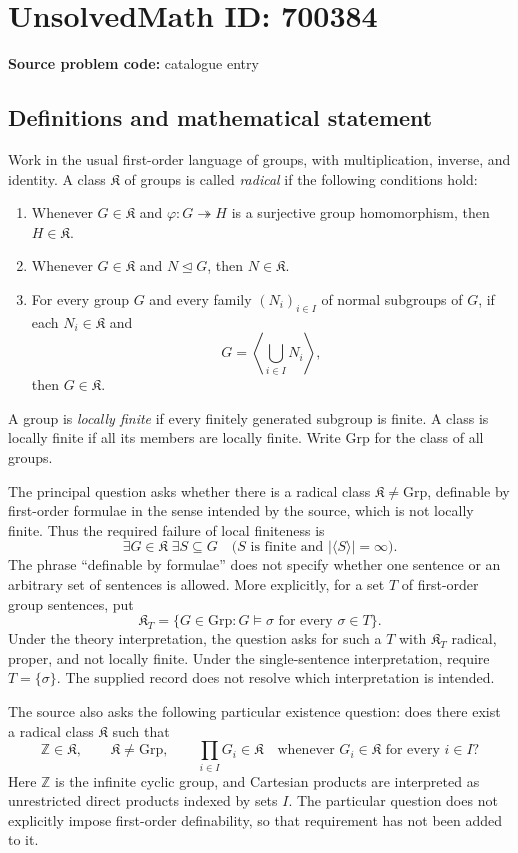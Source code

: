 \documentclass[11pt]{article}
\begin{document}
\section*{UnsolvedMath ID: 700384}
\textbf{Source problem code:} catalogue entry
\subsection{Definitions and mathematical statement}
Work in the usual first-order language of groups, with multiplication, inverse, and identity. A class \(\mathfrak K\) of groups is called \emph{radical} if the following conditions hold:
\begin{enumerate}
\item Whenever \(G\in\mathfrak K\) and \(\varphi:G\twoheadrightarrow H\) is a surjective group homomorphism, then \(H\in\mathfrak K\).
\item Whenever \(G\in\mathfrak K\) and \(N\trianglelefteq G\), then \(N\in\mathfrak K\).
\item For every group \(G\) and every family \((N_i)_{i\in I}\) of normal subgroups of \(G\), if each \(N_i\in\mathfrak K\) and
\[
G=\left\langle\bigcup_{i\in I}N_i\right\rangle,
\]
then \(G\in\mathfrak K\).
\end{enumerate}
A group is \emph{locally finite} if every finitely generated subgroup is finite. A class is locally finite if all its members are locally finite. Write \(\mathrm{Grp}\) for the class of all groups.

The principal question asks whether there is a radical class \(\mathfrak K\ne\mathrm{Grp}\), definable by first-order formulae in the sense intended by the source, which is not locally finite. Thus the required failure of local finiteness is
\[
\exists G\in\mathfrak K\;\exists S\subseteq G\quad
\bigl(S\text{ is finite and }\lvert\langle S\rangle\rvert=\infty\bigr).
\]
The phrase ``definable by formulae'' does not specify whether one sentence or an arbitrary set of sentences is allowed. More explicitly, for a set \(T\) of first-order group sentences, put
\[
\mathfrak K_T=\{G\in\mathrm{Grp}:G\models\sigma\text{ for every }\sigma\in T\}.
\]
Under the theory interpretation, the question asks for such a \(T\) with \(\mathfrak K_T\) radical, proper, and not locally finite. Under the single-sentence interpretation, require \(T=\{\sigma\}\). The supplied record does not resolve which interpretation is intended.

The source also asks the following particular existence question: does there exist a radical class \(\mathfrak K\) such that
\[
\mathbb Z\in\mathfrak K,\qquad
\mathfrak K\ne\mathrm{Grp},\qquad
\prod_{i\in I}G_i\in\mathfrak K
\quad\text{whenever }G_i\in\mathfrak K\text{ for every }i\in I?
\]
Here \(\mathbb Z\) is the infinite cyclic group, and Cartesian products are interpreted as unrestricted direct products indexed by sets \(I\). The particular question does not explicitly impose first-order definability, so that requirement has not been added to it.
\end{document}
